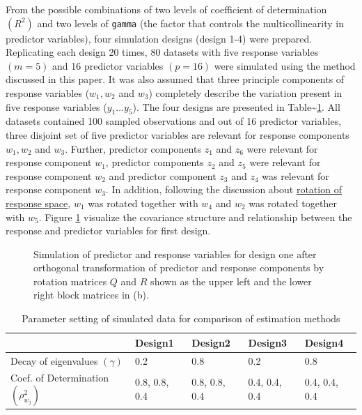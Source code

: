 \documentclass[review]{elsarticle}
\theoremstyle{definition}
\theoremstyle{definition}
\theoremstyle{remark}
\begin{document}
From the possible combinations of two levels of coefficient of
determination \((R^2)\) and two levels of \texttt{gamma} (the factor
that controls the multicollinearity in predictor variables), four
simulation designs (design 1-4) were prepared. Replicating each design
20 times, 80 datasets with five response variables \((m=5)\) and 16
predictor variables \((p = 16)\) were simulated using the method
discussed in this paper. It was also assumed that three principle
components of response variables (\(w_1, w_2\) and \(w_3\)) completely
describe the variation present in five response variables
(\(y_1 \ldots y_5\)). The four designs are presented in
Table\textasciitilde{}\ref{tab:parameter-settings}. All datasets
contained 100 sampled observations and out of 16 predictor variables,
three disjoint set of five predictor variables are relevant for response
components \(w_1, w_2\) and \(w_3\). Further, predictor components
\(z_1\) and \(z_6\) were relevant for response component \(w_1\),
predictor components \(z_2\) and \(z_5\) were relevant for response
component \(w_2\) and predictor component \(z_3\) and \(z_4\) was
relevant for response component \(w_3\). In addition, following the
discussion about \protect\hyperlink{rotation-of-response-space}{rotation
of response space}, \(w_1\) was rotated together with \(w_4\) and
\(w_2\) was rotated together with \(w_5\). Figure
\ref{fig:cov-plot-print-1} visualize the covariance structure and
relationship between the response and predictor variables for first
design.

\begin{figure}[!htb]
\caption{Simulation of predictor and response variables for design one after orthogonal transformation of predictor and response components by rotation matrices $Q$ and $R$ shown as the upper left and the lower right block matrices in (b).}\label{fig:cov-plot-print-1}
\end{figure}

\begin{table}[!h]

\caption{\label{tab:parameter-settings}Parameter setting of simulated data for comparison of estimation methods}
\centering
\begin{tabular}[t]{p{}p{}p{}p{}p{}}
\toprule
  & Design1 & Design2 & Design3 & Design4\\
\midrule
Decay of eigenvalues $(\gamma)$ & 0.2 & 0.8 & 0.2 & 0.8\\
Coef. of Determination $(\rho^2_{w_j})$ & 0.8, 0.8, 0.4 & 0.8, 0.8, 0.4 & 0.4, 0.4, 0.4 & 0.4, 0.4, 0.4\\
\bottomrule
\end{tabular}
\end{table}
\end{document}
